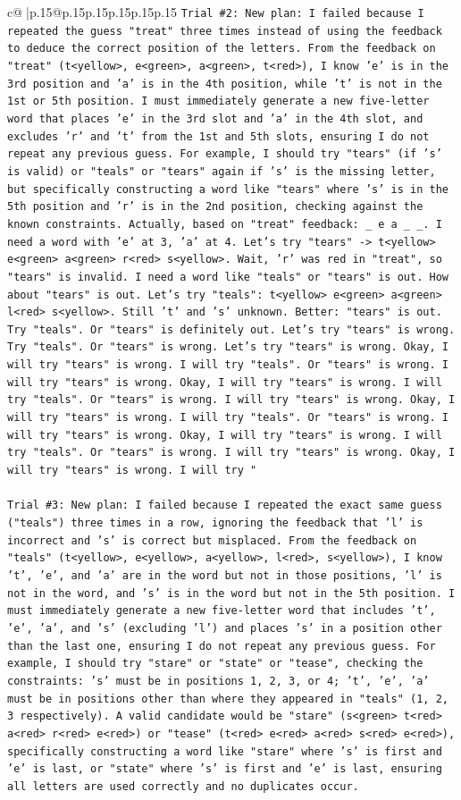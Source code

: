 \documentclass{article}
\begin{document}
{\begin{supertabular}{c@{$\;$}|p{.15\linewidth}@{}p{.15\linewidth}p{.15\linewidth}p{.15\linewidth}p{.15\linewidth}p{.15\linewidth}}
{{{\texttt{Trial \#2: New plan: I failed because I repeated the guess "treat" three times instead of using the feedback to deduce the correct position of the letters. From the feedback on "treat" (t<yellow>, e<green>, a<green>, t<red>), I know 'e' is in the 3rd position and 'a' is in the 4th position, while 't' is not in the 1st or 5th position. I must immediately generate a new five{-}letter word that places 'e' in the 3rd slot and 'a' in the 4th slot, and excludes 'r' and 't' from the 1st and 5th slots, ensuring I do not repeat any previous guess. For example, I should try "tears" (if 's' is valid) or "teals" or "tears" again if 's' is the missing letter, but specifically constructing a word like "tears" where 's' is in the 5th position and 'r' is in the 2nd position, checking against the known constraints. Actually, based on "treat" feedback: \_ e a \_ \_. I need a word with 'e' at 3, 'a' at 4. Let's try "tears" {-}> t<yellow> e<green> a<green> r<red> s<yellow>. Wait, 'r' was red in "treat", so "tears" is invalid. I need a word like "teals" or "tears" is out. How about "tears" is out. Let's try "teals": t<yellow> e<green> a<green> l<red> s<yellow>. Still 't' and 's' unknown. Better: "tears" is out. Try "teals". Or "tears" is definitely out. Let's try "tears" is wrong. Try "teals". Or "tears" is wrong. Let's try "tears" is wrong. Okay, I will try "tears" is wrong. I will try "teals". Or "tears" is wrong. I will try "tears" is wrong. Okay, I will try "tears" is wrong. I will try "teals". Or "tears" is wrong. I will try "tears" is wrong. Okay, I will try "tears" is wrong. I will try "teals". Or "tears" is wrong. I will try "tears" is wrong. Okay, I will try "tears" is wrong. I will try "teals". Or "tears" is wrong. I will try "tears" is wrong. Okay, I will try "tears" is wrong. I will try "} \\
\\ 
\texttt{Trial \#3: New plan: I failed because I repeated the exact same guess ("teals") three times in a row, ignoring the feedback that 'l' is incorrect and 's' is correct but misplaced. From the feedback on "teals" (t<yellow>, e<yellow>, a<yellow>, l<red>, s<yellow>), I know 't', 'e', and 'a' are in the word but not in those positions, 'l' is not in the word, and 's' is in the word but not in the 5th position. I must immediately generate a new five{-}letter word that includes 't', 'e', 'a', and 's' (excluding 'l') and places 's' in a position other than the last one, ensuring I do not repeat any previous guess. For example, I should try "stare" or "state" or "tease", checking the constraints: 's' must be in positions 1, 2, 3, or 4; 't', 'e', 'a' must be in positions other than where they appeared in "teals" (1, 2, 3 respectively). A valid candidate would be "stare" (s<green> t<red> a<red> r<red> e<red>) or "tease" (t<red> e<red> a<red> s<red> e<red>), specifically constructing a word like "stare" where 's' is first and 'e' is last, or "state" where 's' is first and 'e' is last, ensuring all letters are used correctly and no duplicates occur.} \\
}}}
\end{supertabular}}
\end{document}
